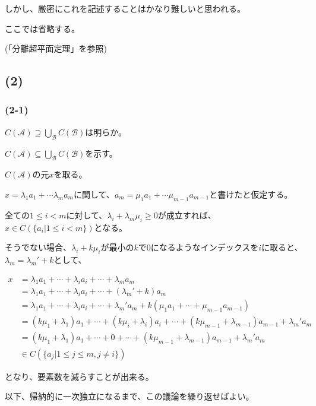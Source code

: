 \documentclass[a4paper, 10pt, dvipdfmx]{jlreq}
\begin{document}
しかし、厳密にこれを記述することはかなり難しいと思われる。

ここでは省略する。

(「分離超平面定理」を参照)

\subsection*{(2)}

\subsubsection*{(2-1)}

$C(\mathcal{A}) \supseteq \bigcup_{\mathcal{B}}C(\mathcal{B})$は明らか。

$C(\mathcal{A}) \subseteq \bigcup_{\mathcal{B}}C(\mathcal{B})$を示す。

$C(\mathcal{A})$の元$x$を取る。

$x=\lambda_1 a_1+ \cdots \lambda_m a_m$に関して、$a_m=\mu_1 a_1 + \cdots \mu_{m-1} a_{m-1}$と書けたと仮定する。

全ての$1 \leq i < m$に対して、$\lambda_i+\lambda_m \mu_i \geq 0$が成立すれば、$x \in C(\{a_i | 1 \leq i < m \})$となる。

そうでない場合、$\lambda_i+k \mu_i$が最小の$k$で0になるようなインデックスを$i$に取ると、$\lambda_m=\lambda_m'+k$として、

\begin{align*}
  x & =\lambda_1 a_1 + \cdots + \lambda_i a_i + \cdots + \lambda_m a_m                                                       \\
    & =\lambda_1 a_1 + \cdots + \lambda_i a_i + \cdots +(\lambda_m'+k) a_m                                                   \\
    & =\lambda_1 a_1 + \cdots + \lambda_i a_i + \cdots + \lambda_m' a_m + k(\mu_1a_1+\cdots+\mu_{m-1}a_{m-1})                \\
    & =(k\mu_1+\lambda_1) a_1 + \cdots + (k\mu_i+\lambda_i)a_i + \cdots + (k \mu_{m-1}+\lambda_{m-1}) a_{m-1}+\lambda_m' a_m \\
    & =(k\mu_1+\lambda_1) a_1 + \cdots + 0 + \cdots + (k \mu_{m-1}+\lambda_{m-1}) a_{m-1}+\lambda_m' a_m                     \\
    & \in C(\{a_j | 1 \leq j \leq m, j\neq i \})
\end{align*}

となり、要素数を減らすことが出来る。

以下、帰納的に一次独立になるまで、この議論を繰り返せばよい。
\end{document}
